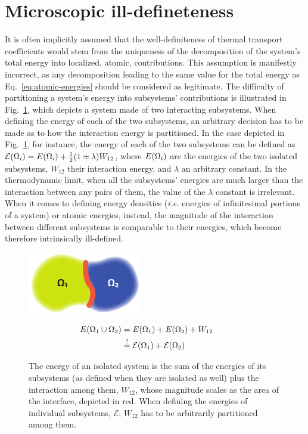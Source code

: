 \section{Microscopic ill-defineteness}

It is often implicitly assumed that the well-definiteness of thermal transport coefficients would stem from the uniqueness of the decomposition of the system's total energy into localized, atomic, contributions. This assumption is manifestly incorrect, as any decomposition leading to the same value for the total energy as Eq.~\eqref{eq:atomic-energies} should be considered as legitimate. The difficulty of partitioning a system's energy into subsystems' contributions is illustrated in Fig.~\ref{fig:energy-partition}, which depicts a system made of two interacting subsystems. When defining the energy of each of the two subsystems, an arbitrary decision has to be made as to how the interaction energy is partitioned. In the case depicted in Fig.~\ref{fig:energy-partition}, for instance, the energy of each of the two subsystems can be defined as $\mathcal{E}({\mathrm\Omega}_i) = E({\mathrm\Omega}_i) + \frac{1}{2}(1\pm\lambda)W_{12}$, where $E({\mathrm\Omega}_i)$ are the energies of the two isolated subsystems, $W_{12}$ their interaction energy, and $\lambda$ an arbitrary constant. In the thermodynamic limit, when all the subsystems' energies are much larger than the interaction between any pairs of them, the value of the $\lambda$ constant is irrelevant. When it comes to defining energy densities (\emph{i.e.} energies of infinitesimal portions of a system) or atomic energies, instead, the magnitude of the interaction between different subsystems is comparable to their energies, which become therefore intrinsically ill-defined.

\begin{figure}[t]
    \begin{minipage}{0.45\textwidth}
        \centering \includegraphics[width=5cm]{chapters/chapter3/figures/blob.pdf}
    \end{minipage}
    \begin{minipage}{0.45\textwidth}
        \begin{align*}
        E({\mathrm\Omega}_{1}\cup{\mathrm\Omega}_2) &= E({\mathrm\Omega}_1) + E({\mathrm\Omega}_2) + W_{12} \qquad \\
        & \overset{?}{=}\mathcal{E}({\mathrm\Omega}_1)+\mathcal{E}({\mathrm\Omega}_2)
        \end{align*}
    \end{minipage}
\caption{
	The energy of an isolated system is the sum of the energies of its subsystems (as defined when they are isolated as well) plus the interaction among them, $W_{12}$, whose magnitude scales as the area of the interface, depicted in red. When defining the energies of individual subsystems, $\mathcal{E}$, $W_{12}$ has to be arbitrarily partitioned among them.
	}
	\label{fig:energy-partition}
\end{figure}

